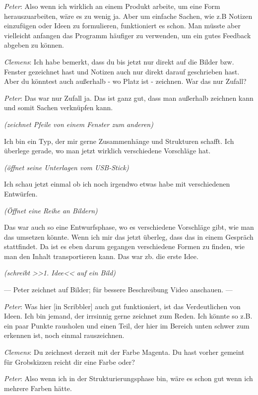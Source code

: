 \medskip \emph{Peter}: Also wenn ich wirklich an einem Produkt arbeite, um eine Form herauszuarbeiten, wäre es zu wenig ja. Aber um einfache Sachen, wie z.B Notizen einzufügen oder Ideen zu formulieren, funktioniert es schon. Man müsste aber vielleicht anfangen das Programm häufiger zu verwenden, um ein gutes Feedback abgeben zu können.

\medskip \emph{Clemens}: Ich habe bemerkt, dass du bis jetzt nur direkt auf die Bilder bzw. Fenster gezeichnet hast und Notizen auch nur direkt darauf geschrieben hast. Aber du könntest auch außerhalb - wo Platz ist - zeichnen. War das nur Zufall?

\medskip \emph{Peter}: Das war nur Zufall ja. Das ist ganz gut, dass man außerhalb zeichnen kann und somit Sachen verknüpfen kann. 

\smallskip \emph{(zeichnet Pfeile von einem Fenster zum anderen)}

\smallskip Ich bin ein Typ, der mir gerne Zusammenhänge und Strukturen schafft.
Ich überlege gerade, wo man jetzt wirklich verschiedene Vorschläge hat.

\smallskip \emph{(öffnet seine Unterlagen vom \ac{USB}-Stick)} 

\smallskip Ich schau jetzt einmal ob ich noch irgendwo etwas habe mit verschiedenen Entwürfen. 

\smallskip \emph{(Öffnet eine Reihe an Bildern)}

\smallskip Das war auch so eine Entwurfsphase, wo es verschiedene Vorschläge gibt, wie man das umsetzen könnte. Wenn ich mir das jetzt überleg, dass das in einem Gespräch stattfindet. Da ist es eben darum gegangen verschiedene Formen zu finden, wie man den Inhalt transportieren kann. Das war zb. die erste Idee.

\smallskip \emph{(schreibt >>1. Idee<< auf ein Bild)}

\smallskip --- Peter zeichnet auf Bilder; für bessere Beschreibung Video anschauen. ---

\medskip \emph{Peter}: Was hier [in Scribbler] auch gut funktioniert, ist das Verdeutlichen von Ideen. Ich bin jemand, der irrsinnig gerne zeichnet zum Reden. Ich könnte so z.B. ein paar Punkte rausholen und einen Teil, der hier im Bereich unten schwer zum erkennen ist, noch einmal rauszeichnen.

\medskip \emph{Clemens}: Du zeichnest derzeit mit der Farbe Magenta. Du hast vorher gemeint für Grobskizzen reicht dir eine Farbe oder?

\medskip \emph{Peter}: Also wenn ich in der Strukturierungsphase bin, wäre es schon gut wenn ich mehrere Farben hätte.


